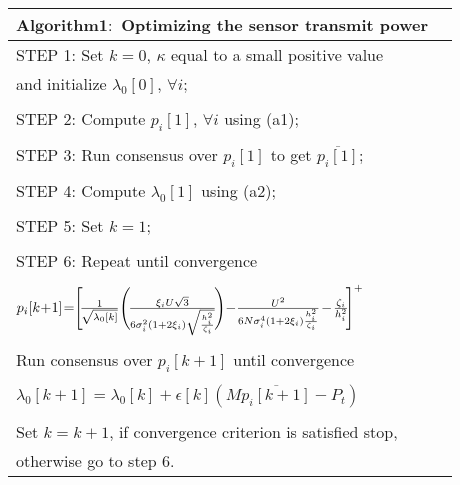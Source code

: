\documentclass[conference]{IEEEtran}
\begin{document}
\begin{table}[htp!] 
\small
\centering \begin{tabular}{l r} \hline\hline $\boldsymbol{Algorithm1:}$ Optimizing the sensor transmit power \\ [0.6ex] 
\hline STEP 1:  Set $k=0$, $\kappa$ equal to a small positive value  \\  \hspace{1.2cm} and initialize $\lambda_0\left[0\right]$, $\forall i$;\\  \\ STEP 2:  Compute  $p_i\left[1\right]$,  $\forall i $ using (a1);\\  \\
STEP 3:  Run consensus over $p_i\left[1\right]$ to get $\overline{p_i\left[1\right]};$\\ \\ 
STEP 4:  Compute $\lambda_0\left[1\right]$ using (a2);\\ \\
STEP 5:  Set $k=1$;\\ \\
STEP 6:  Repeat until convergence  \\ \\ $p_{i}[k\hspace{-0.07cm}+\hspace{-0.07cm}1]\hspace{-0.07cm}=\hspace{-0.1cm}\Biggl[\hspace{-0.07cm}\frac{1}{\sqrt{\lambda_0[k]}}\Biggl(\hspace{-0.05cm}\frac{\xi_i U\sqrt{3}}{6\sigma_i^{2}\left(1+2\xi_i\right)\sqrt{\frac{h_i^{2}}{\zeta_i}}}\hspace{-0.05cm}\Biggl) - \frac{U^2}{6N\sigma_i^{4}\left(1+2\xi_i\right)\frac{h_i^{2}}{\zeta_i}} \hspace{-0.05cm}-\hspace{-0.05cm}\frac{\zeta_i}{h_i^{2}}\hspace{-0.07cm}\Biggr]^{+}$ \hspace{-2.4cm}\\ \\ Run consensus over $p_i\left[k+1\right] $ until convergence \\ \\ \hspace{0.6cm} $\lambda_0\left[k+1\right]=\lambda_0\left[k\right]+\epsilon\left[k\right]\left(M \overline{p_i\left[k+1\right]}-P_t\right)$ \\ \\ Set $k=k+1$, if convergence criterion is satisfied stop, \\  otherwise go to step 6. \\ [0.5ex]  \hline \end{tabular} 
\label{tab:hresult} 
\end{table} 
\end{document}
